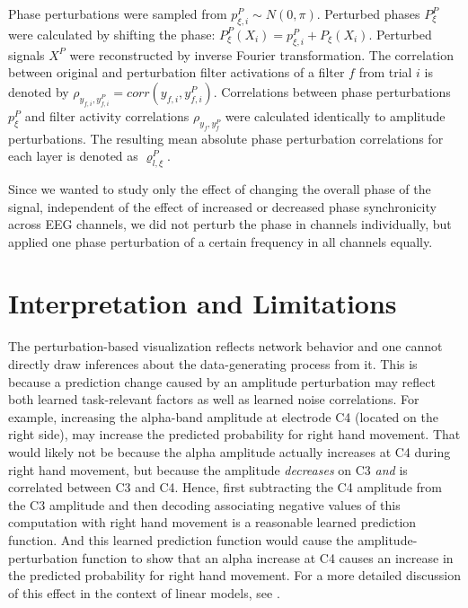 Phase perturbations were sampled from $p^{P}_{\xi,i}{\sim}N(0,\pi)$.
Perturbed phases $P^{P}_\xi$ were calculated by shifting the phase:
$P^{P}_\xi(X_i)=p^{P}_{\xi,i}+P_\xi(X_i)$. Perturbed signals $X^{P}$
were reconstructed by inverse Fourier transformation. The correlation
between original and perturbation filter activations of a filter $f$
from trial $i$ is denoted by
$\rho_{y_{f,i},y^{P}_{f,i}}=corr(y_{f,i},y^{P}_{f,i})$. Correlations
between phase perturbations $p^{P}_{\xi}$ and filter activity
correlations $\rho_{y_{f},y^{P}_{f}}$ were calculated identically to
amplitude perturbations. The resulting mean absolute phase perturbation
correlations for each layer is denoted as $\varrho^P_{l,\xi}$.

Since we wanted to study only the effect of changing the overall phase
of the signal, independent of the effect of increased or decreased phase
synchronicity across EEG channels, we did not perturb the phase in
channels individually, but applied one phase perturbation of a certain
frequency in all channels equally.

\section{Interpretation and Limitations}
\label{perturbation-visualization-interpretation}


    The perturbation-based visualization reflects network behavior and one
cannot directly draw inferences about the data-generating process from
it. This is because a prediction change caused by an amplitude
perturbation may reflect both learned task-relevant factors as well as
learned noise correlations. For example, increasing the alpha-band
amplitude at electrode C4 (located on the right side), may increase the
predicted probability for right hand movement. That would likely not be
because the alpha amplitude actually increases at C4 during right hand
movement, but because the amplitude \emph{decreases} on C3 \emph{and} is
correlated between C3 and C4. Hence, first subtracting the C4 amplitude
from the C3 amplitude and then decoding associating negative values of
this computation with right hand movement is a reasonable learned
prediction function. And this learned prediction function would cause
the amplitude-perturbation function to show that an alpha increase at C4
causes an increase in the predicted probability for right hand movement.
For a more detailed discussion of this effect in the context of linear
models, see \citep{haufe_interpretation_2014}.

    

